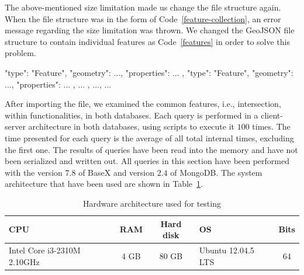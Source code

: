 \documentclass[a4paper,12pt]{article}
\begin{document}
The above-mentioned size limitation made us change the file structure again.
When the file structure was in the form of Code~\ref{feature-collection}, 
an error message regarding the size limitation was thrown. 
We changed the GeoJSON file structure to contain individual features as Code~\ref{features} in order to solve this problem.
\vspace{10px}
\begin{fakeXML}[label=features,caption=A GeoJSON file restructured regarding the size limitation]
    {
      "type": "Feature",
      "geometry": {...},
      "properties": {...}
    },
    {
      "type": "Feature",
      "geometry": {...},
      "properties": {...}
    }, 
    { ... }, ..., { ... }
\end{fakeXML}
\vspace{10px}
After importing the file, we examined the common features, i.e., intersection, within functionalities, in both databases. Each query is performed in a client-server architecture in both databases, using scripts to execute it $100$ times. The time presented for each query is the average of all total internal times, excluding the first one. The results of queries have been read into the memory and have not been serialized and written out. All queries in this section have been performed with the version $7.8$ of BaseX and version $2.4$ of MongoDB. The system architecture that have been used are shown in Table~\ref{t.sysarchi}.

\begin{table}
\centering
\begin{tabular}{|l | c | c| l | c |}\hline
\textbf{CPU} & \textbf{RAM} & \textbf{Hard disk} & \textbf{OS} & \textbf{Bits}\\\hline
 Intel Core i3-2310M 2.10GHz & 4 GB & 80 GB & Ubuntu 12.04.5 LTS & 64\\\hline
\end{tabular}
\caption{Hardware architecture used for testing}
\label{t.sysarchi}
\end{table}
\end{document}
